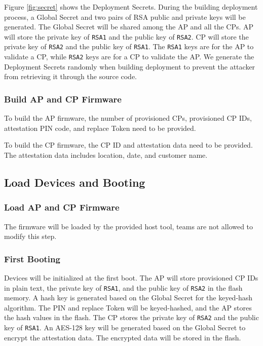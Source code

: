 \documentclass[11pt,oneside,onecolumn,letterpaper]{article}
\newcounter{alg}
\begin{document}
	Figure \ref{fig:secret} shows the Deployment Secrets.
	During the building deployment process,
	a Global Secret and two pairs of RSA public and private keys will be generated.
	The Global Secret will be shared among the AP and all the CPs.
	AP will store the private key of \texttt{RSA1} and the public key of \texttt{RSA2}.
	CP will store the private key of \texttt{RSA2} and the public key of \texttt{RSA1}.
	The \texttt{RSA1} keys are for the AP to validate a CP,
	while \texttt{RSA2} keys are for a CP to validate the AP.
	We generate the Deployment Secrets randomly when building deployment to prevent the attacker from retrieving it through the source code.
	
	\subsubsection{Build AP and CP Firmware}
	To build the AP firmware,
	the number of provisioned CPs,
	provisioned CP IDs,
	attestation PIN code,
	and replace Token need to be provided.
	
	To build the CP firmware,
	the CP ID and attestation data need to be provided.
	The attestation data includes location,
	date,
	and customer name.
	
	\subsection{Load Devices and Booting}
	\subsubsection{Load AP and CP Firmware}
	The firmware will be loaded by the provided host tool,
	teams are not allowed to modify this step.
	
	\subsubsection{First Booting}
	Devices will be initialized at the first boot.
	The AP will store provisioned CP IDs in plain text,
	the private key of \texttt{RSA1},
	and the public key of \texttt{RSA2} in the flash memory.
	A hash key is generated based on the Global Secret for the keyed-hash algorithm.
	The PIN and replace Token will be keyed-hashed,
	and the AP stores the hash values in the flash.
	The CP stores the private key of \texttt{RSA2} and the public key of \texttt{RSA1}.
	An AES-128 key will be generated based on the Global Secret to encrypt the attestation data.
	The encrypted data will be stored in the flash.
	
\end{document}
